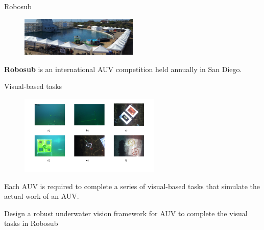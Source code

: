 \documentclass[13pt]{beamer}
\begin{document}
\begin{frame}{Robosub}

  \begin{figure}[ht]
      \centering
      \includegraphics[width=0.5\textwidth, height=0.3\textwidth]{figs/robosub.jpg}
  \end{figure}

  \textbf{Robosub} is an international AUV competition held annually in San Diego.

\end{frame}

\begin{frame}{Visual-based tasks}

  \begin{figure}[ht]
      \centering
      \includegraphics[width=0.6\textwidth, height=0.4\textwidth]{figs/tasks.png}
  \end{figure}

  Each AUV is required to complete a series of visual-based tasks that simulate
  the actual work of an AUV.

\end{frame}

\begin{frame}[standout]{}
  Design a robust underwater vision framework for AUV to complete the visual tasks
  in Robosub
\end{frame}
\end{document}
